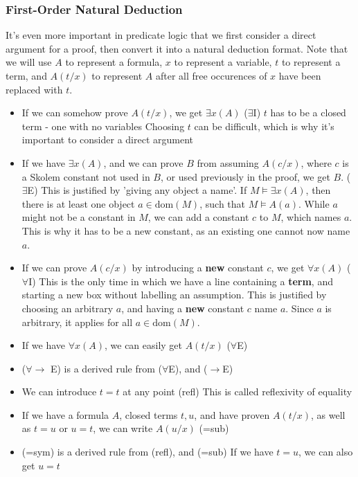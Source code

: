\documentclass[a4paper, 12pt]{article}
\begin{document}
            \subsubsection*{First-Order Natural Deduction}
                It's even more important in predicate logic that we first consider a direct argument for a proof, then convert it into a natural deduction format. Note that we will use $A$ to represent a formula, $x$ to represent a variable, $t$ to represent a term, and $A(t/x)$ to represent $A$ after all free occurences of $x$ have been replaced with $t$.
                \begin{itemize}
                    \itemsep0em
                    \item If we can somehow prove $A(t/x)$, we get $\exists x (A)$ \hfill ($\exists$I)
                        \subitem $t$ has to be a closed term - one with no variables
                        \subitem Choosing $t$ can be difficult, which is why it's important to consider a direct argument
                    \item If we have $\exists x (A)$, and we can prove $B$ from assuming $A(c/x)$, where $c$ is a Skolem constant not used in $B$, or used previously in the proof, we get $B$. \hfill ($\exists$E)
                        \subitem This is justified by 'giving any object a name'. If $M \vDash \exists x (A)$, then there is at least one object $a \in \text{dom}(M)$, such that $M \vDash A(a)$. While $a$ might not be a constant in $M$, we can add a constant $c$ to $M$, which names $a$. This is why it has to be a new constant, as an existing one cannot now name $a$.
                    \item If we can prove $A(c/x)$ by introducing a \textbf{new} constant $c$, we get $\forall x (A)$ \hfill ($\forall$I)
                        \subitem This is the only time in which we have a line containing a \textbf{term}, and starting a new box without labelling an assumption.
                        \subitem This is justified by choosing an arbitrary $a$, and having a \textbf{new} constant $c$ name $a$. Since $a$ is arbitrary, it applies for all $a \in \text{dom}(M)$.
                    \item If we have $\forall x (A)$, we can easily get $A(t/x)$ \hfill ($\forall$E)
                    \item ($\forall \rightarrow$ E) is a derived rule from ($\forall$E), and ($\rightarrow$E)
                    \item We can introduce $t = t$ at any point \hfill (refl)
                        \subitem This is called reflexivity of equality
                    \item If we have a formula $A$, closed terms $t,u$, and have proven $A(t/x)$, as well as $t = u$ or $u = t$, we can write $A(u/x)$ \hfill (=sub)
                    \item (=sym) is a derived rule from (refl), and (=sub)
                        \subitem If we have $t = u$, we can also get $u = t$
                \end{itemize}
\end{document}
